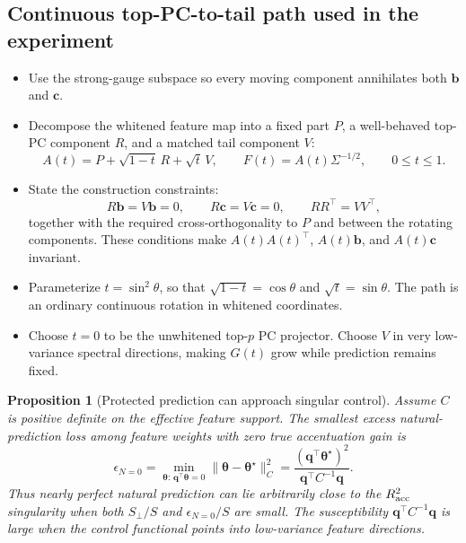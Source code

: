 \documentclass[11pt]{article}
\newtheorem{proposition}[theorem]{Proposition}
\newcommand{\tstar}{\bm\theta^{\star}}
\begin{document}
\subsection{Continuous top-PC-to-tail path used in the experiment}

\begin{itemize}
  \item Use the strong-gauge subspace so every moving component annihilates
        both $\bm b$ and $\bm c$.
  \item Decompose the whitened feature map into a fixed part $P$, a
        well-behaved top-PC component $R$, and a matched tail component $V$:
  \begin{equation}
    A(t)=P+\sqrt{1-t}\,R+\sqrt t\,V,
    \qquad
    F(t)=A(t)\Sigma^{-1/2},
    \qquad 0\le t\le1.
    \label{eq:continuous-path}
  \end{equation}
  \item State the construction constraints:
  \begin{equation}
    R\bm b=V\bm b=0,
    \qquad
    R\bm c=V\bm c=0,
    \qquad
    RR^{\top}=VV^{\top},
  \end{equation}
  together with the required cross-orthogonality to $P$ and between the
  rotating components. These conditions make $A(t)A(t)^{\top}$,
  $A(t)\bm b$, and $A(t)\bm c$ invariant.
  \item Parameterize $t=\sin^2\theta$, so that
        $\sqrt{1-t}=\cos\theta$ and $\sqrt t=\sin\theta$. The path is an
        ordinary continuous rotation in whitened coordinates.
  \item Choose $t=0$ to be the unwhitened top-$p$ PC projector. Choose $V$
        in very low-variance spectral directions, making $G(t)$ grow while
        prediction remains fixed.
\end{itemize}

\begin{proposition}[Protected prediction can approach singular control]
\label{prop:protected-singularity}
Assume $C$ is positive definite on the effective feature support. The smallest
excess natural-prediction loss among feature weights with zero true
accentuation gain is
\begin{equation}
  \epsilon_{N=0}
  =\min_{\bm\theta:\,\bm q^{\top}\bm\theta=0}
     \lVert\bm\theta-\tstar\rVert_C^2
  =\frac{(\bm q^{\top}\tstar)^2}
         {\bm q^{\top}C^{-1}\bm q}.
  \label{eq:cost-zero-gain}
\end{equation}
Thus nearly perfect natural prediction can lie arbitrarily close to the
$R_{\rm acc}^{2}$ singularity when both $S_{\perp}/S$ and
$\epsilon_{N=0}/S$ are small. The susceptibility
$\bm q^{\top}C^{-1}\bm q$ is large when the control functional points into
low-variance feature directions.
\end{proposition}
\end{document}
